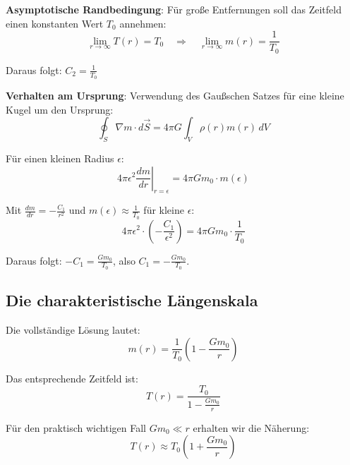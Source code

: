	\textbf{Asymptotische Randbedingung}: Für große Entfernungen soll das Zeitfeld einen konstanten Wert $T_0$ annehmen:
	\begin{equation}
		\lim_{r \to \infty} T(r) = T_0 \quad \Rightarrow \quad \lim_{r \to \infty} m(r) = \frac{1}{T_0}
	\end{equation}
	
	Daraus folgt: $C_2 = \frac{1}{T_0}$
	
	\textbf{Verhalten am Ursprung}: Verwendung des Gaußschen Satzes \citep{griffiths1999,jackson1998} für eine kleine Kugel um den Ursprung:
	\begin{equation}
		\oint_S \nabla m \cdot d\vec{S} = 4\pi G \int_V \rho(r) m(r) \, dV
	\end{equation}
	
	Für einen kleinen Radius $\epsilon$:
	\begin{equation}
		4\pi \epsilon^2 \left.\frac{dm}{dr}\right|_{r=\epsilon} = 4\pi G m_0 \cdot m(\epsilon)
	\end{equation}
	
	Mit $\frac{dm}{dr} = -\frac{C_1}{r^2}$ und $m(\epsilon) \approx \frac{1}{T_0}$ für kleine $\epsilon$:
	\begin{equation}
		4\pi \epsilon^2 \cdot \left(-\frac{C_1}{\epsilon^2}\right) = 4\pi G m_0 \cdot \frac{1}{T_0}
	\end{equation}
	
	Daraus folgt: $-C_1 = \frac{G m_0}{T_0}$, also $C_1 = -\frac{G m_0}{T_0}$.
	
	\subsection{Die charakteristische Längenskala}
	\label{subsec:characteristic_length}
	
	Die vollständige Lösung lautet:
	\begin{equation}
		m(r) = \frac{1}{T_0}\left(1 - \frac{G m_0}{r}\right)
	\end{equation}
	
	Das entsprechende Zeitfeld ist:
	\begin{equation}
		T(r) = \frac{T_0}{1 - \frac{G m_0}{r}}
	\end{equation}
	
	Für den praktisch wichtigen Fall $G m_0 \ll r$ erhalten wir die Näherung:
	\begin{equation}
		T(r) \approx T_0\left(1 + \frac{G m_0}{r}\right)
	\end{equation}
	
